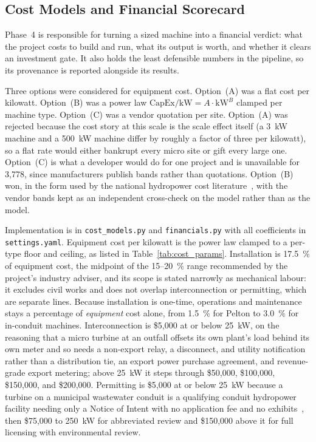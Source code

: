 \documentclass[12pt,letterpaper]{report}
\begin{document}
\subsection{Cost Models and Financial Scorecard}

Phase~4 is responsible for turning a sized machine into a financial verdict: what
the project costs to build and run, what its output is worth, and whether it
clears an investment gate. It also holds the least defensible numbers in the
pipeline, so its provenance is reported alongside its results.

Three options were considered for equipment cost. Option~(A) was a flat cost per
kilowatt. Option~(B) was a power law
$\mathrm{CapEx}/\mathrm{kW} = A \cdot \mathrm{kW}^{B}$ clamped per machine type.
Option~(C) was a vendor quotation per site. Option~(A) was rejected because the
cost story at this scale is the scale effect itself (a 3~kW machine and a
500~kW machine differ by roughly a factor of three per kilowatt), so a flat rate
would either bankrupt every micro site or gift every large one. Option~(C) is
what a developer would do for one project and is unavailable for 3{,}778, since
manufacturers publish bands rather than quotations. Option~(B) won, in the form
used by the national hydropower cost literature~\cite{doe_vision, ornl2014}, with
the vendor bands kept as an independent cross-check on the model rather than as
the model.

Implementation is in \texttt{cost\_models.py} and \texttt{financials.py} with all
coefficients in \texttt{settings.yaml}. Equipment cost per kilowatt is the power
law clamped to a per-type floor and ceiling, as listed in
Table~\ref{tab:cost_params}. Installation is 17.5~\% of equipment cost, the
midpoint of the 15--20~\% range recommended by the project's industry adviser,
and its scope is stated narrowly as mechanical labour: it excludes civil works
and does not overlap interconnection or permitting, which are separate lines.
Because installation is one-time, operations and maintenance stays a percentage of
\emph{equipment} cost alone, from 1.5~\% for Pelton to 3.0~\% for in-conduit
machines. Interconnection is \$5{,}000 at or below 25~kW, on the reasoning that a
micro turbine at an outfall offsets its own plant's load behind its own meter and
so needs a non-export relay, a disconnect, and utility notification rather than a
distribution tie, an export power purchase agreement, and revenue-grade export
metering; above 25~kW it steps through \$50{,}000, \$100{,}000, \$150{,}000, and
\$200{,}000. Permitting is \$5{,}000 at or below 25~kW because a turbine on a
municipal wastewater conduit is a qualifying conduit hydropower facility needing
only a Notice of Intent with no application fee and no
exhibits~\cite{ferc_conduit}, then \$75{,}000 to 250~kW for abbreviated review and
\$150{,}000 above it for full licensing with environmental review.
\end{document}
